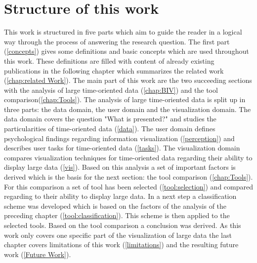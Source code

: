 \section{Structure of this work}
This work is structured in five parts which aim to guide the reader in a logical way through the process of answering the research question. The first part (\ref{concepts}) gives some definitions and basic concepts which are used throughout this work. These definitions are filled with content of already existing publications in the following chapter which summarizes the related work (\ref{chap:related Work}). The main part of this work are the two succeeding sections with the analysis of large time-oriented data (\ref{chap:BIV}) and the tool comparison(\ref{chap:Tools}). The analysis of large time-oriented data is split up in three parts: the data domain, the user domain and the visualization domain. The data domain covers the question "What is presented?" and studies the particularities of time-oriented data (\ref{data}). The user domain defines psychological findings regarding information visualization  (\ref{perception}) and describes user tasks for time-oriented data (\ref{tasks}). The visualization domain compares visualization techniques for time-oriented data regarding their ability to display large data (\ref{vis}). Based on this analysis a set of important factors is derived which is the basis for the next section: the tool comparison (\ref{chap:Tools}). For this comparison a set of tool has been selected (\ref{tool:selection}) and compared regarding to their ability to display large data. In a next step a  classification scheme was developed which is based on the factors of the analysis of the preceding chapter (\ref{tool:classification}). This scheme is then applied to the selected tools.
Based on the tool comparison a conclusion was derived.
As this work only covers one specific part of the visualization of large data the last chapter covers limitations of this work (\ref{limitations}) and the resulting future work (\ref{Future Work}).